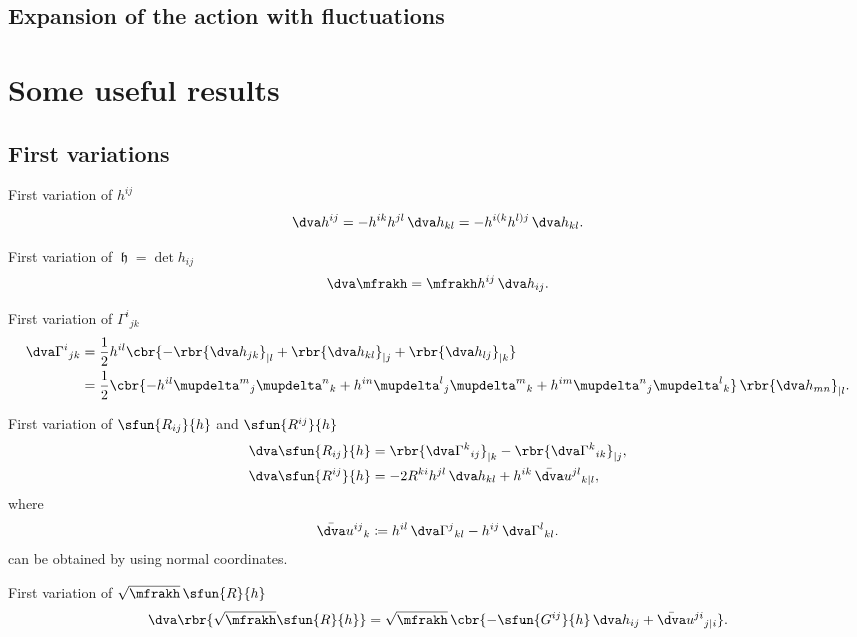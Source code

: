 \documentclass[a4paper,11pt]{article}
\begin{document}
\subsection{Expansion of the action with fluctuations}

\appendix

\section*{Some useful results}

\subsection*{First variations}

First variation of $h^{ij}$
\begin{align}
\dva h^{ij} = -h^{ik}h^{jl}\,\dva h_{kl} = - h^{i(k}h^{l)j}\,\dva h_{kl}.
\end{align}

First variation of $\mfrakh = \det h_{ij}$
\begin{align}
\dva \mfrakh = \mfrakh h^{ij}\,\dva h_{ij}.
\end{align}

First variation of $\Gamma^i{}_{jk}$
\begin{align}
\dva \Gamma^{i}{}_{jk} &= \frac{1}{2} h^{il}
\cbr{-\rbr{\dva h_{jk}}_{|l} + \rbr{\dva h_{kl}}_{|j} + \rbr{\dva h_{lj}}_{|k}}
\\
&= \frac{1}{2} \cbr{-h^{il}\mupdelta^m{}_j\mupdelta^n{}_k
+h^{in}\mupdelta^l{}_j\mupdelta^m{}_k
+h^{im}\mupdelta^n{}_j\mupdelta^l{}_k}\,\rbr{\dva h_{mn}}_{|l}.
\end{align}

First variation of $\sfun{R_{ij}}{h}$ and $\sfun{R^{ij}}{h}$
\begin{align}
\dva \sfun{R_{ij}}{h} &=
\rbr{\dva\Gamma^k{}_{ij}}_{|k} - \rbr{\dva\Gamma^k{}_{ik}}_{|j},
\label{eq:var-R_{ij}}
\\
\dva \sfun{R^{ij}}{h} &=
-2R^{ki}h^{jl}\,\dva h_{kl} + h^{ik}\,\bar{\dva}u^{jl}{}_{k|l},
\end{align}
where
\begin{align}
\bar{\dva}u^{ij}{}_{k} \coloneqq
h^{il}\,\dva\Gamma^{j}{}_{kl} - h^{ij}\,\dva\Gamma^{l}{}_{kl}.
\end{align}
 can be obtained by using normal coordinates.

First variation of $\sqrt{\mfrakh}\,\sfun{R}{h}$
\begin{align}
\dva\rbr{\sqrt{\mfrakh}\sfun{R}{h}} = \sqrt{\mfrakh}\,
\cbr{-\sfun{G^{ij}}{h}\,\dva h_{ij} +
\bar{\dva}u^{ji}{}_{j|i}}.
\end{align}
\end{document}
